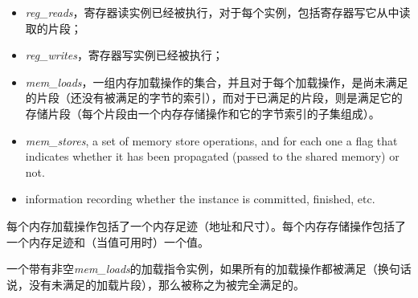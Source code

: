 \begin{itemize}
\item {\it reg\_reads}，寄存器读实例已经被执行，对于每个实例，包括寄存器写它从中读取的片段； %
\item {\it reg\_writes}，寄存器写实例已经被执行； %
\item {\it mem\_loads}，一组内存加载操作的集合，并且对于每个加载操作，是尚未满足的片段（还没有被满足的字节的索引），而对于已满足的片段，则是满足它的存储片段（每个片段由一个内存存储操作和它的字节索引的子集组成）。  %
\item {\it mem\_stores}, a set of memory store operations, and for each one a flag that indicates whether it has been propagated (passed to the shared memory) or not.
\item information recording whether the instance is committed, finished, etc.
\end{itemize}

每个内存加载操作包括了一个内存足迹（地址和尺寸）。每个内存存储操作包括了一个内存足迹和（当值可用时）一个值。

一个带有非空{\it mem\_loads}的加载指令实例，如果所有的加载操作都被满足（换句话说，没有未满足的加载片段），那么被称之为被完全满足的。

